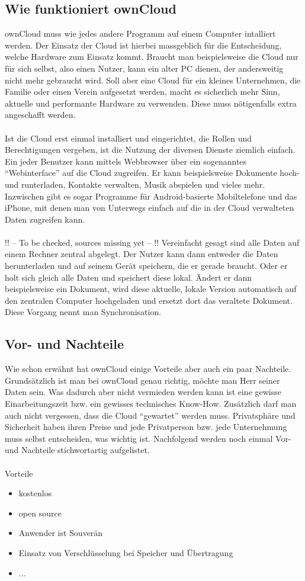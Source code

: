 \subsection{Wie funktioniert ownCloud}
ownCloud muss wie jedes andere Programm auf einem Computer intalliert werden. Der Einsatz der Cloud ist hierbei massgeblich für die Entscheidung, welche Hardware zum Einsatz kommt. Braucht man beispielsweise die Cloud nur für sich selbst, also einen Nutzer, kann ein alter PC dienen, der andersweitig nicht mehr gebraucht wird. Soll aber eine Cloud für ein kleines Unternehmen, die Familie oder einen Verein aufgesetzt werden, macht es sicherlich mehr Sinn, aktuelle und performante Hardware zu verwenden. Diese muss nötigenfalls extra angeschafft werden. 
\\ 
\\
Ist die Cloud erst einmal installiert und eingerichtet, die Rollen und Berechtigungen vergeben, ist die Nutzung der diversen Dienste ziemlich einfach. Ein jeder Benutzer kann mittels Webbrowser über ein sogenanntes ``Webinterface'' auf die Cloud zugreifen. Er kann beispielsweise Dokumente hoch- und runterladen, Kontakte verwalten, Musik abspielen und vieles mehr.
Inzwischen gibt es sogar Programme für Android-basierte Mobiltelefone und das iPhone, mit denen man von Unterwegs einfach auf die in der Cloud verwalteten Daten zugreifen kann.
\\
\\
!! -- To be checked, sources missing yet -- !!
Vereinfacht gesagt sind alle Daten auf einem Rechner zentral abgelegt. Der Nutzer kann dann entweder die Daten herunterladen und auf seinem Gerät speichern, die er gerade braucht. Oder er holt sich gleich alle Daten und speichert diese lokal. Ändert er dann beispielsweise ein Dokument, wird diese aktuelle, lokale Version automatisch auf den zentralen Computer hochgeladen und ersetzt dort das veraltete Dokument. Diese Vorgang nennt man Synchronisation.

\subsection{Vor- und Nachteile}
Wie schon erwähnt hat ownCloud einige Vorteile aber auch ein paar Nachteile. Grundsätzlich ist man bei ownCloud genau richtig, möchte man Herr seiner Daten sein. Was dadurch aber nicht vermieden werden kann ist eine gewisse Einarbeitungszeit bzw. ein gewisses technisches Know-How. Zusätzlich darf man auch nicht vergessen, dass die Cloud ``gewartet'' werden muss. Privatsphäre und Sicherheit haben ihren Preise und jede Privatperson bzw. jede Unternehmung muss selbst entscheiden, was wichtig ist. 
Nachfolgend werden noch einmal Vor- und Nachteile stichwortartig aufgelistet. 
\\
\\
Vorteile
\begin{itemize}
\item kostenlos
\item open source 
\item Anwender ist Souverän 
\item Einsatz von Verschlüsselung bei Speicher und Übertragung
\item ...
\end{itemize}

